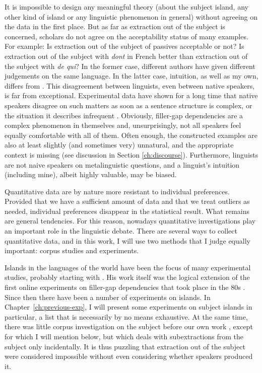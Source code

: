 \label{ch:exp-methodo}
It is impossible to design any meaningful theory (about the subject island, any other kind of island or any linguistic phenomenon in general) without agreeing on the data in the first place. But as far as extraction out of the subject is concerned, scholars do not agree on the acceptability status of many examples. For example: Is extraction out of the subject of passives acceptable or not? Is extraction out of the subject with \emph{dont} in French better than extraction out of the subject with \emph{de qui}? In the former case, different authors have given different judgements on the same language. In the latter case,  intuition, as well as my own, differs from . 
This disagreement between linguists, even between native speakers, is far from exceptional. Experimental data have shown for a long time that native speakers disagree on such matters as soon as a sentence structure is complex, or the situation it describes infrequent \citep{Chaves.2019.Frequency}. Obviously, filler-gap dependencies are a complex phenomenon in themselves and, unsurprisingly, not all speakers feel equally comfortable with all of them. Often enough, the constructed examples are also at least slightly (and sometimes very) unnatural, and the appropriate context is missing (see discussion in Section \ref{ch:discourse}). Furthermore, linguists are not naive speakers on metalinguistic questions, and a linguist's intuition (including mine), albeit highly valuable, may be biased.

Quantitative data are by nature more resistant to individual preferences. Provided that we have a sufficient amount of data and that we treat outliers as needed, individual preferences disappear in the statistical result. What remains are general tendencies.
For this reason, nowadays quantitative investigations play an important role  in the linguistic debate.
There are several ways to collect quantitative data, and in this work, I will use two methods that I judge equally important: corpus studies and experiments. 

Islands in the languages of the world have been the focus of many experimental studies, probably starting with \citet{Kluender.1991}. His work itself was the logical extension of the first online experiments on filler-gap dependencies that took place in the 80s \citep[a.o.][]{Tanenhaus.1985,Stowe.1986}. Since then there have been a number of experiments on islands. In Chapter~\ref{ch:previous-exp}, I will present some experiments on subject islands in particular, a list that is  necessarily by no means exhaustive. At the same time, there was little corpus investigation on the subject before our own work \citep{Abeille.2016,Abeille.2020.JFLS}, except for \citet{Candito.2012.ldd} which I will mention below, but which deals with subextractions from the subject only incidentally. It is thus puzzling that extraction out of the subject were considered impossible without even considering whether speakers produced it. 

